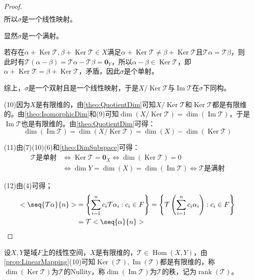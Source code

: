 \begin{proof}
\begin{align*}
	\end{align*}
	所以$\sigma$是一个线性映射。\par
	显然$\sigma$是一个满射。\par
	若存在$\alpha+\operatorname{Ker}\mathcal{T},\beta+\operatorname{Ker}\mathcal{T}\in X$满足$\alpha+\operatorname{Ker}\mathcal{T}\ne\beta+\operatorname{Ker}\mathcal{T}$且$\mathcal{T}\alpha=\mathcal{T}\beta$，则此时有$\mathcal{T}(\alpha-\beta)=\mathcal{T}\alpha-\mathcal{T}\beta=\mathbf{0}_Y$，所以$\alpha-\beta\in\operatorname{Ker}\mathcal{T}$，即$\alpha+\operatorname{Ker}\mathcal{T}=\beta+\operatorname{Ker}\mathcal{T}$，矛盾，因此$\sigma$是个单射。\par
	综上，$\sigma$是一个双射且是一个线性映射，于是$X/\operatorname{Ker}\mathcal{T}$与$\operatorname{Im}\mathcal{T}$在$\sigma$下同构。\par
	(10)因为$X$是有限维的，由\cref{theo:QuotientDim}可知$X/\operatorname{Ker}\mathcal{T}$和$\operatorname{Ker}\mathcal{T}$都是有限维的。由\cref{theo:IsomorphicDim}和(9)可知$\dim(X/\operatorname{Ker}\mathcal{T})=\dim(\operatorname{Im}\mathcal{T})$，于是$\operatorname{Im}\mathcal{T}$也是有限维的。由\cref{theo:QuotientDim}可得：
	\begin{equation*}
		\dim(\operatorname{Im}\mathcal{T})=\dim(X/\operatorname{Ker}\mathcal{T})=\dim(X)-\dim(\operatorname{Ker}\mathcal{T})
	\end{equation*}\par
	(11)由(7)(10)(6)和\cref{theo:DimSubspace}可得：
	\begin{align*}
		\mathcal{T}\text{是单射}
		&\iff\operatorname{Ker}\mathcal{T}=\mathbf{0}_X	\iff\dim(\operatorname{Ker}\mathcal{T})=0 \\
		&\iff\dim Y=\dim(X)=\dim(\operatorname{Im}\mathcal{T})
		\iff\mathcal{T}\text{是满射}
	\end{align*}\par
	(12)由(4)可得；
	\begin{align*}
		<\seq{\mathcal{T}\alpha}{n}>&=\left\{\sum_{i=1}^{n}c_i\mathcal{T}\alpha_i:c_i\in F\right\}=\left\{\mathcal{T}\left(\sum_{i=1}^{n}c_i\alpha_i\right):c_i\in F\right\} \\
		&=\mathcal{T}<\seq{\alpha}{n}>\qedhere
	\end{align*}
\end{proof}
\begin{definition}
	设$X,Y$是域$F$上的线性空间，$X$是有限维的，$\mathcal{T}\in\operatorname{Hom}(X,Y)$，由\cref{prop:LinearMapping}(10)可知$\operatorname{Ker}(\mathcal{T}),\operatorname{Im}(\mathcal{T})$都是有限维的，称$\dim(\operatorname{Ker}\mathcal{T})$为$\mathcal{T}$的\gls{Nullity}，称$\dim(\operatorname{Im}\mathcal{T})$为$\mathcal{T}$的秩，记为$\operatorname{rank}(\mathcal{T})$。
\end{definition}
